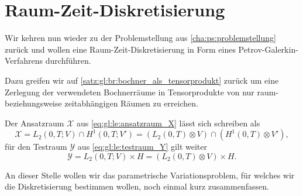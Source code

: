 
\section{Raum-Zeit-Diskretisierung} %
\label{sub:raum_zeit_diskretisierung}

Wir kehren nun wieder zu der Problemstellung aus \cref{cha:ps:problemstellung} zurück und wollen eine Raum-Zeit-Diskretisierung in Form eines Petrov-Galerkin-Verfahrens durchführen.

Dazu greifen wir auf \cref{satz:gl:br:bochner_als_tensorprodukt} zurück um eine Zerlegung der verwendeten Bochnerräume in Tensorprodukte von nur raum- beziehungsweise zeitabhängigen Räumen zu erreichen.

\begin{Korollar}
    Der Ansatzraum $\mathcal X$ aus \cref{eq:gl:le:ansatzraum_X} lässt sich schreiben als
    \begin{equation}
        \label{eq:gal:ansatzraum_tensor}
        \mathcal X = L_{2}(0, T; V) \cap H^{1}(0, T; V')
            = (L_2(0, T) \otimes V) \cap (H^{1}(0, T) \otimes V'),
    \end{equation}
    für den Testraum $\mathcal Y$ aus \cref{eq:gl:le:testraum_Y} gilt weiter
    \begin{equation}
        \label{eq:gal:testraum_tensor}
        \mathcal Y = L_{2}(0, T; V) \times H = (L_{2}(0, T) \otimes V) \times H.
    \end{equation}
\end{Korollar}

An dieser Stelle wollen wir das parametrische Variationsproblem, für welches wir die Diskretisierung bestimmen wollen, noch einmal kurz zusammenfassen.

\begin{Bemerkung}
\end{Bemerkung}

